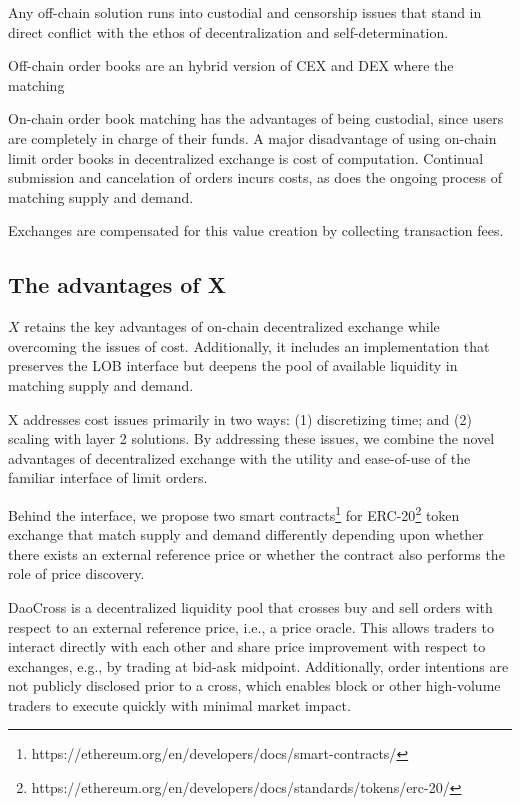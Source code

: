 \documentclass[11pt, reqno]{amsart}
\theoremstyle{definition}
\theoremstyle{remark}
\begin{document}
Any off-chain solution runs into custodial and censorship issues that stand
in direct conflict with the ethos of decentralization and self-determination.

Off-chain order books are an hybrid version of CEX and DEX where the matching

On-chain order book matching has the advantages of being custodial, since users
are completely in charge of their funds.
A major disadvantage of using on-chain limit order books in decentralized
exchange is cost of computation. Continual submission and cancelation of orders
incurs costs, as does the ongoing process of matching supply and demand.

Exchanges are compensated for this value creation by collecting transaction
fees.

\subsection{The advantages of X}

$X$ retains the key advantages of on-chain decentralized exchange while
overcoming the issues of cost. Additionally, it includes an implementation
that preserves the LOB interface but deepens the pool of available
liquidity in matching supply and demand.

X addresses cost issues primarily in two ways: (1) discretizing time; and (2)
scaling with layer 2 solutions. By addressing these issues, we combine the novel
advantages of decentralized exchange with the utility and ease-of-use of the
familiar interface of limit orders.

Behind the interface, we propose two smart
contracts\footnote{https://ethereum.org/en/developers/docs/smart-contracts/}
for
ERC-20\footnote{https://ethereum.org/en/developers/docs/standards/tokens/erc-20/}
token exchange that match supply and demand differently depending upon whether
there exists an external reference price or whether the contract also performs
the role of price discovery.

DaoCross is a decentralized liquidity pool that crosses buy and sell orders
with respect to an external reference price, i.e., a price oracle. This allows
traders to interact directly with each other and share price improvement with
respect to exchanges, e.g., by trading at bid-ask midpoint. Additionally, order
intentions are not publicly disclosed prior to a cross, which enables block or
other high-volume traders to execute quickly with minimal market impact.
\end{document}
